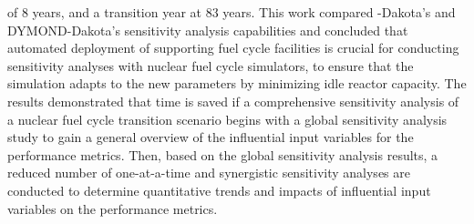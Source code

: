 of 8 years, and a transition year at 83 years. 
This work compared \Cyclus-Dakota's and DYMOND-Dakota's sensitivity 
analysis capabilities 
and concluded that automated deployment of supporting fuel cycle 
facilities is crucial for conducting sensitivity analyses 
with nuclear fuel cycle simulators, to ensure that the simulation 
adapts to the new parameters by minimizing idle reactor capacity. 
The results demonstrated that time is saved if a comprehensive 
sensitivity analysis of a nuclear fuel cycle transition scenario 
begins with a global sensitivity analysis study to gain a general 
overview of the influential input variables for the performance metrics. 
Then, based on the global sensitivity analysis results, a reduced number of 
one-at-a-time and synergistic sensitivity analyses are conducted 
to determine quantitative trends and impacts of influential 
input variables on the performance metrics.